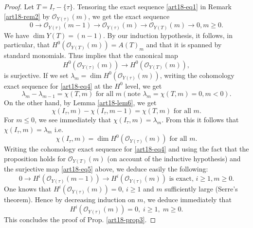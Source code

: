\begin{proof}
Let  $T = I_\tau - \{\tau\}$. Tensoring the exact sequence \ref{art18-eq1} in Remark \ref{art18-rem2} by $\mathscr{O}_{Y(\tau)} (m)$, we get the exact sequence
\begin{equation*}
0 \to \mathscr{O}_{Y(\tau)} (m-1) \to\mathscr{O}_{Y(\tau)} (m) \to \mathscr{O}_{Y(T)} (m) \to0, m \geqslant 0. \tag*{(4)}\label{art18-eq4}
\end{equation*}
We have $\dim Y(T) = (n-1)$. By our induction hypothesis, it follows, in particular, that $H^0(\mathscr{O}_{Y(T)} (m)) = A(T)_m$ and that it is spanned by standard monomials. Thus implies that the canonical map
\begin{equation*}
H^0(\mathscr{O}_{Y(\tau)}(m)) \to H^0 (\mathscr{O}_{Y(T)} (m)), \tag*{(5)}\label{art18-eq5}
\end{equation*}
is surjective. If we set $\lambda_m = \dim H^0(\mathscr{O}_{Y(\tau)}(m))$, writing the cohomology exact sequence for \ref{art18-eq4} at the $H^0$ level, we get 
$$
\lambda_m - \lambda_{m-1} =\chi (T,m) \text{ for all } m (\text{note } \lambda_m = \chi (T, m) = 0, m < 0 ). 
$$
On the other hand, by Lemma \ref{art18-lem6}, we get 
$$
\chi (I_\tau, m) -\chi (I_\tau, m-1) = \chi (T,m) \text{ for all } m.
$$
For $m \leqslant 0$, we see immediately that $\chi (I_\tau, m) = \lambda_m$. From this it follows that $\chi(I_\tau, m) = \lambda_m$ i.e.
$$
\chi(I_\tau, m) = \dim H^0(\mathscr{O}_{Y(\tau)}(m)) \text{ for all }m.
$$
Writing the cohomology exact sequence for \ref{art18-eq4} and using the fact that the proposition holds for $\mathscr{O}_{Y(T)} (m)$ (on account of the inductive hypothesis) and the surjective map \ref{art18-eq5} above, we deduce easily the following:
$$
0 \to H^i (\mathscr{O}_{Y(\tau)}(m-1)) \to H^i (\mathscr{O}_{Y(\tau)}(m)) \text{ is exact, } i \geqslant 1, m \geqslant 0.
$$\pageoriginale
One knows that $H^i(\mathscr{O}_{Y(\tau)}(m)) = 0$, $i \geqslant 1$ and $m$ sufficiently large (Serre's theorem). Hence by decreasing induction on $m$, we deduce immediately that 
$$
H^i (\mathscr{O}_{Y(\tau)} (m)) = 0, \; i \geqslant 1, \; m \geqslant 0.
$$
This concludes the proof of Prop. \ref{art18-prop3}.
\end{proof}


